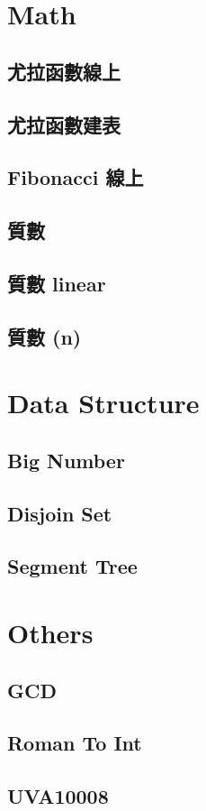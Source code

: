 \section{Math}
\subsection{尤拉函數線上}

\subsection{尤拉函數建表}

\subsection{Fibonacci 線上}

\subsection{質數}

\subsection{質數 linear}

\subsection{質數 (n)}


\section{Data Structure}
\subsection{Big Number}

\subsection{Disjoin Set}

\subsection{Segment Tree}


\section{Others}
\subsection{GCD}

\subsection{Roman To Int}

\subsection{UVA10008}
